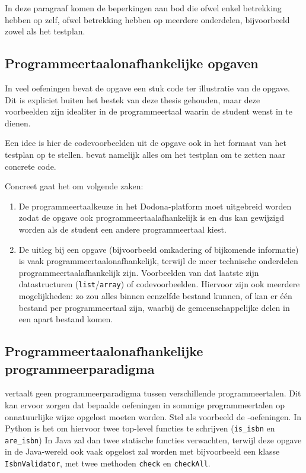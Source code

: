 In deze paragraaf komen de beperkingen aan bod die ofwel enkel betrekking hebben op \tested{} zelf, ofwel betrekking hebben op meerdere onderdelen, bijvoorbeeld zowel \tested{} als het testplan.

\subsection{Programmeertaalonafhankelijke opgaven}\label{subsec:programmeertaalonafhankelijke-opgaven}

In veel oefeningen bevat de opgave een stuk code ter illustratie van de opgave.
Dit is expliciet buiten het bestek van deze thesis gehouden, maar deze voorbeelden zijn idealiter in de programmeertaal waarin de student wenst in te dienen.

Een idee is hier de codevoorbeelden uit de opgave ook in het formaat van het testplan op te stellen.
\tested{} bevat namelijk alles om het testplan om te zetten naar concrete code.

Concreet gaat het om volgende zaken:
\begin{enumerate}
    \item De programmeertaalkeuze in het Dodona-platform moet uitgebreid worden zodat de opgave ook programmeertaalafhankelijk is en dus kan gewijzigd worden als de student een andere programmeertaal kiest.
    \item De uitleg bij een opgave (bijvoorbeeld omkadering of bijkomende informatie) is vaak programmeertaalonafhankelijk, terwijl de meer technische onderdelen programmeertaalafhankelijk zijn.
    Voorbeelden van dat laatste zijn datastructuren (\texttt{list}/\texttt{array}) of codevoorbeelden.
    Hiervoor zijn ook meerdere mogelijkheden: zo zou alles binnen eenzelfde bestand kunnen, of kan er één bestand per programmeertaal zijn, waarbij de gemeenschappelijke delen in een apart bestand komen.
\end{enumerate}



\subsection{Programmeertaalonafhankelijke programmeerparadigma}\label{subsec:programmeertaalonafhankelijke-programmeerparadigma}

\tested{} vertaalt geen programmeerparadigma tussen verschillende programmeertalen.
Dit kan ervoor zorgen dat bepaalde oefeningen in sommige programmeertalen op onnatuurlijke wijze opgelost moeten worden.
Stel als voorbeeld de -oefeningen.
In Python is het  om hiervoor twee top-level functies te schrijven (\texttt{is\_isbn} en \texttt{are\_isbn})
In Java zal \tested{} dan twee statische functies verwachten, terwijl deze opgave in de Java-wereld ook vaak opgelost zal worden met bijvoorbeeld een klasse \texttt{IsbnValidator}, met twee methoden \texttt{check} en \texttt{checkAll}.

